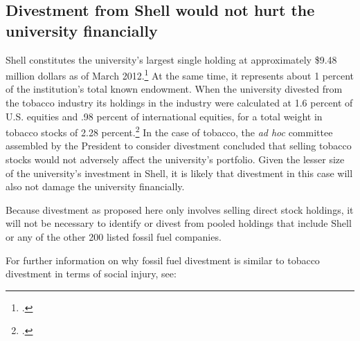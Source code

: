 	\subsection{Divestment from Shell would not hurt the university financially}
	\label{sec:ShellNotFinancialHurt}



Shell constitutes the university's largest single holding at approximately \$9.48 million dollars as of March 2012.\footcite[][]{UTAM_2012}  
At the same time, it represents about 1 percent of the institution's total known endowment.
When the university divested from the tobacco industry its holdings in the industry were calculated at 1.6 percent of U.S. equities and .98 percent of international equities, for a total weight in tobacco stocks of 2.28 percent.\footcite[][]{TobaccoReport_2007}
In the case of tobacco, the \emph{ad hoc} committee assembled by the President to consider divestment concluded that selling tobacco stocks  would not adversely affect the university's portfolio. 
Given the lesser size of the university's investment in Shell, it is likely that divestment in this case will also not damage the university financially.



Because divestment as proposed here only involves selling direct stock holdings, it will not be necessary to identify or divest from pooled holdings that include Shell or any of the other 200 listed fossil fuel companies.



For further information on why fossil fuel divestment is similar to tobacco divestment in terms of social injury, see: 



